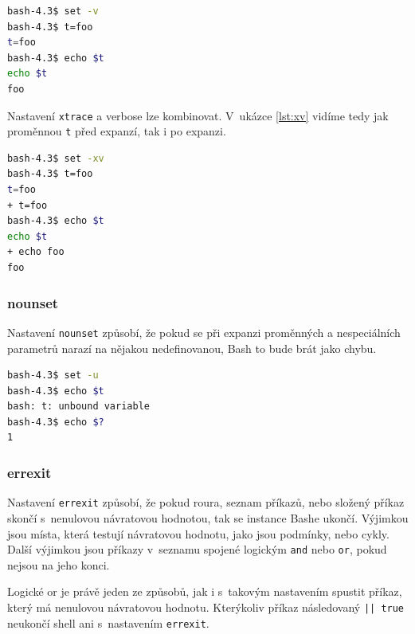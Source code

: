 \documentclass[thesis=M,czech]{FITthesis}[2012/06/26]
\begin{document}
\noindent
\begin{minipage}{\linewidth}
\begin{lstlisting}[language=bash, caption={Nastavní verbose}, label={lst:verbose}]
bash-4.3$ set -v
bash-4.3$ t=foo
t=foo
bash-4.3$ echo $t
echo $t
foo
\end{lstlisting}
\end{minipage}

Nastavení \texttt{xtrace} a verbose lze kombinovat. V~ukázce \ref{lst:xv} vidíme tedy jak proměnnou \texttt{t} před expanzí, tak i po expanzi.

\noindent
\begin{minipage}{\linewidth}
\begin{lstlisting}[language=bash, caption={Výstup z~knihovny Bashlex}, label={lst:xv}]
bash-4.3$ set -xv
bash-4.3$ t=foo
t=foo
+ t=foo
bash-4.3$ echo $t
echo $t
+ echo foo
foo
\end{lstlisting}
\end{minipage}


\subsubsection{nounset}

Nastavení \texttt{nounset} způsobí, že pokud se při expanzi proměnných a nespeciálních parametrů narazí na nějakou nedefinovanou, Bash to bude brát jako chybu.

\noindent
\begin{minipage}{\linewidth}
\begin{lstlisting}[language=bash, caption={nounset}, label={lst:unbound}]
bash-4.3$ set -u
bash-4.3$ echo $t
bash: t: unbound variable
bash-4.3$ echo $?
1
\end{lstlisting}
\end{minipage}

\subsubsection{errexit}

Nastavení \texttt{errexit} způsobí, že pokud roura, seznam příkazů, nebo složený příkaz skončí s~nenulovou návratovou hodnotou, tak se instance Bashe ukončí. Výjimkou jsou místa, která testují návratovou hodnotu, jako jsou podmínky, nebo cykly. Další výjimkou jsou příkazy v~seznamu spojené logickým \texttt{and} nebo \texttt{or}, pokud nejsou na jeho konci.

Logické or je právě jeden ze způsobů, jak i s~takovým nastavením spustit příkaz, který má nenulovou návratovou hodnotu. Kterýkoliv příkaz následovaný \texttt{|| true} neukončí shell ani s~nastavením \texttt{errexit}.
\end{document}
